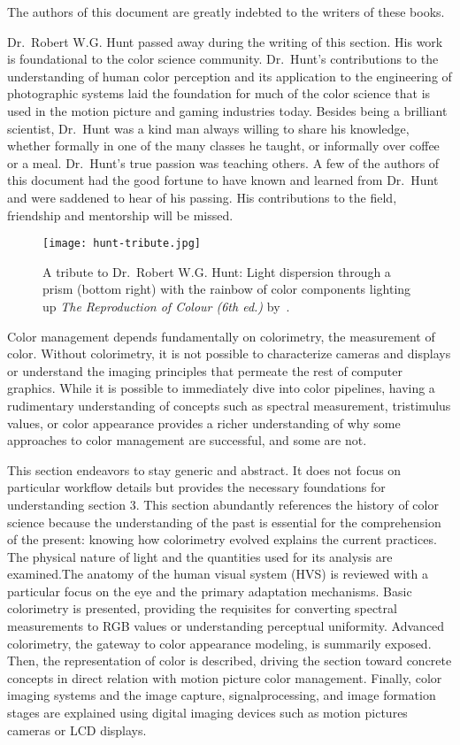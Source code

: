 The authors of this document are greatly indebted to the writers of these books.

Dr.~Robert W.G. Hunt passed away during the writing of this section. His work is foundational to the color science community. Dr.~Hunt’s contributions to the understanding of human color perception and its application to the engineering of photographic systems laid the foundation for much of the color science that is used in the motion picture and gaming industries today.
Besides being a brilliant scientist, Dr.~Hunt was a kind man always willing to share his knowledge, whether formally in one of the many classes he taught, or informally over coffee or a meal.
Dr.~Hunt’s true passion was teaching others.
A few of the authors of this document had the good fortune to have known and learned from Dr.~Hunt and were saddened to hear of his passing.
His contributions to the field, friendship and mentorship will be missed.

\begin{figure}[H]
    \texttt{[image: hunt-tribute.jpg]}
    \caption{
        A tribute to Dr.~Robert W.G. Hunt: Light dispersion through a prism (bottom right) with the rainbow of color components lighting up \textit{The Reproduction of Colour (6th ed.)} by~\textcite{Hunt2004b}.
    }%
    \label{fig:hunt-tribute}
\end{figure}

Color management depends fundamentally on colorimetry, the measurement of color.
Without colorimetry, it is not possible to characterize cameras and displays or understand the imaging principles that permeate the rest of computer graphics.
While it is possible to immediately dive into color pipelines, having a rudimentary understanding of concepts such as spectral measurement, tristimulus values, or color appearance provides a richer understanding of why some approaches to color management are successful, and some are not.

This section endeavors to stay generic and abstract. It does not focus on particular workflow details but provides the necessary foundations for understanding section 3.
This section abundantly references the history of color science because the understanding of the past is essential for the comprehension of the present: knowing how colorimetry evolved explains the current practices.
The physical nature of light and the quantities used for its analysis are examined.The anatomy of the human visual system (HVS) is reviewed with a particular focus on the eye and the primary adaptation mechanisms.
Basic colorimetry is presented, providing the requisites for converting spectral measurements to RGB values or understanding perceptual uniformity.
Advanced colorimetry, the gateway to color appearance modeling, is summarily exposed.
Then, the representation of color is described, driving the section toward concrete concepts in direct relation with motion picture color management.
Finally, color imaging systems and the image capture, signalprocessing, and image formation stages are explained using digital imaging devices such as motion pictures cameras or LCD displays.

